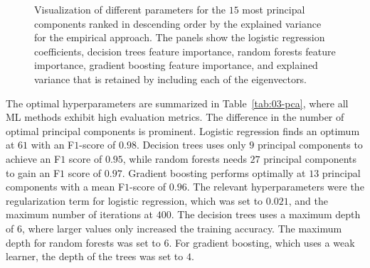 \documentclass[superscriptaddress,unsortedaddress,
 amsmath,amssymb,
 aps,
]{revtex4-2}
\begin{document}
\begin{figure}[ht!]
  \begin{subfigure}[b]{0.5\textwidth}
    \centering
    
    \label{fig:03-fi-a}
  \end{subfigure}%
  
  \begin{subfigure}[b]{0.5\textwidth}
    \centering
    
    \label{fig:03-fi-b}
  \end{subfigure}%
  
  \begin{subfigure}[b]{0.5\textwidth}
    \centering
    
    \label{fig:03-fi-c}
  \end{subfigure}%
  
  \begin{subfigure}[b]{0.5\textwidth}
    \centering
    
    \label{fig:03-fi-d}
  \end{subfigure}%
  
  \begin{subfigure}[b]{0.5\textwidth}
    \centering
    
    \label{fig:03-fi-e}
  \end{subfigure}%
  
  \caption{Visualization of different parameters for the $15$ most principal components ranked in descending order by the explained variance for the empirical approach. The panels show the logistic regression coefficients, decision trees feature importance, random forests feature importance, gradient boosting feature importance, and explained variance that is retained by including each of the eigenvectors. }
  \label{fig:03-fi}
\end{figure}

The optimal hyperparameters are summarized in Table~\ref{tab:03-pca}, where all ML methods exhibit high evaluation metrics. The difference in the number of optimal principal components is prominent. Logistic regression finds an optimum at $61$ with an F$1$-score of $0.98$. Decision trees uses only $9$ principal components to achieve an F$1$ score of $0.95$, while random forests needs $27$ principal components to gain an F$1$ score of $0.97$. 
Gradient boosting performs optimally at $13$ principal components with a mean F$1$-score of $0.96$. The relevant hyperparameters were the regularization term for logistic regression, which was set to $0.021$, and the maximum number of iterations at $400$. The decision trees uses a maximum depth of $6$, where larger values only increased the training accuracy. The maximum depth for  random forests was set to $6$. For gradient boosting, which uses a weak learner, the depth of the trees was set to  $4$. 
\end{document}
